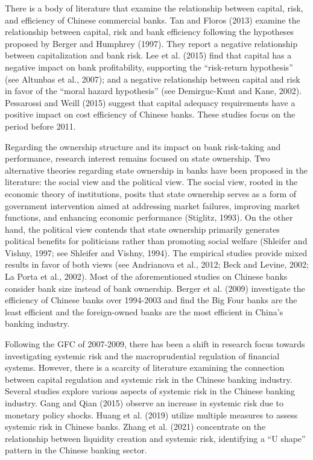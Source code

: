 \documentclass[
  12pt,
  a4paper,
  DIV=11,
  numbers=noendperiod]{scrreprt}
\begin{document}
There is a body of literature that examine the relationship between
capital, risk, and efficiency of Chinese commercial banks. Tan and
Floros (2013) examine the relationship between capital, risk and bank
efficiency following the hypotheses proposed by Berger and Humphrey
(1997). They report a negative relationship between capitalization and
bank risk. Lee et al. (2015) find that capital has a negative impact on
bank profitability, supporting the ``risk-return hypothesis'' (see
Altunbas et al., 2007); and a negative relationship between capital and
risk in favor of the ``moral hazard hypothesis'' (see Demirguc-Kunt and
Kane, 2002). Pessarossi and Weill (2015) suggest that capital adequacy
requirements have a positive impact on cost efficiency of Chinese banks.
These studies focus on the period before 2011.

Regarding the ownership structure and its impact on bank risk-taking and
performance, research interest remains focused on state ownership. Two
alternative theories regarding state ownership in banks have been
proposed in the literature: the social view and the political view. The
social view, rooted in the economic theory of institutions, posits that
state ownership serves as a form of government intervention aimed at
addressing market failures, improving market functions, and enhancing
economic performance (Stiglitz, 1993). On the other hand, the political
view contends that state ownership primarily generates political
benefits for politicians rather than promoting social welfare (Shleifer
and Vishny, 1997; see Shleifer and Vishny, 1994). The empirical studies
provide mixed results in favor of both views (see Andrianova et al.,
2012; Beck and Levine, 2002; La Porta et al., 2002). Most of the
aforementioned studies on Chinese banks consider bank size instead of
bank ownership. Berger et al. (2009) investigate the efficiency of
Chinese banks over 1994-2003 and find the Big Four banks are the least
efficient and the foreign-owned banks are the most efficient in China's
banking industry.

Following the GFC of 2007-2009, there has been a shift in research focus
towards investigating systemic risk and the macroprudential regulation
of financial systems. However, there is a scarcity of literature
examining the connection between capital regulation and systemic risk in
the Chinese banking industry. Several studies explore various aspects of
systemic risk in the Chinese banking industry. Gang and Qian (2015)
observe an increase in systemic risk due to monetary policy shocks.
Huang et al. (2019) utilize multiple measures to assess systemic risk in
Chinese banks. Zhang et al. (2021) concentrate on the relationship
between liquidity creation and systemic risk, identifying a ``U shape''
pattern in the Chinese banking sector.
\end{document}
